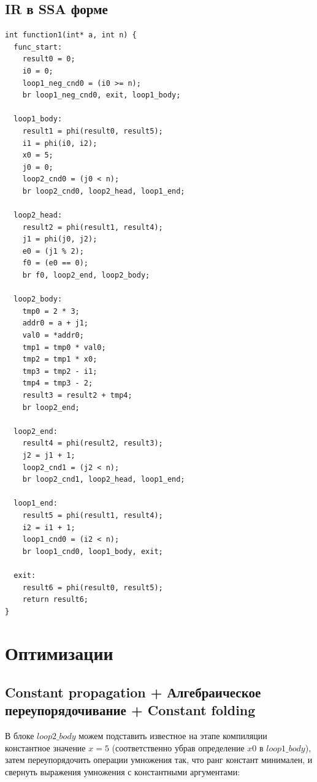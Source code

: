 \newpage
\subsection{IR в SSA форме}
\begin{lstlisting}
int function1(int* a, int n) {
  func_start:
    result0 = 0;
    i0 = 0;
    loop1_neg_cnd0 = (i0 >= n);
    br loop1_neg_cnd0, exit, loop1_body;

  loop1_body:
    result1 = phi(result0, result5);
    i1 = phi(i0, i2);
    x0 = 5;
    j0 = 0;
    loop2_cnd0 = (j0 < n);
    br loop2_cnd0, loop2_head, loop1_end;

  loop2_head:
    result2 = phi(result1, result4);
    j1 = phi(j0, j2);
    e0 = (j1 % 2);
    f0 = (e0 == 0);
    br f0, loop2_end, loop2_body;

  loop2_body:
    tmp0 = 2 * 3;
    addr0 = a + j1;
    val0 = *addr0;
    tmp1 = tmp0 * val0;
    tmp2 = tmp1 * x0;
    tmp3 = tmp2 - i1;
    tmp4 = tmp3 - 2;
    result3 = result2 + tmp4;
    br loop2_end;

  loop2_end:
    result4 = phi(result2, result3);
    j2 = j1 + 1;
    loop2_cnd1 = (j2 < n);
    br loop2_cnd1, loop2_head, loop1_end;

  loop1_end:
    result5 = phi(result1, result4);
    i2 = i1 + 1;
    loop1_cnd0 = (i2 < n);
    br loop1_cnd0, loop1_body, exit;

  exit:
    result6 = phi(result0, result5);
    return result6;
}
\end{lstlisting}

\section{Оптимизации}
\subsection{Constant propagation + Алгебраическое переупорядочивание + Constant folding}
В блоке  $loop2\_body$ можем подставить известное на этапе компиляции константное значение $x = 5$ (соответственно убрав определение $x0$ в $loop1\_body$), затем переупорядочить операции умножения так, что ранг констант минимален, и свернуть выражения умножения с константными аргументами:

